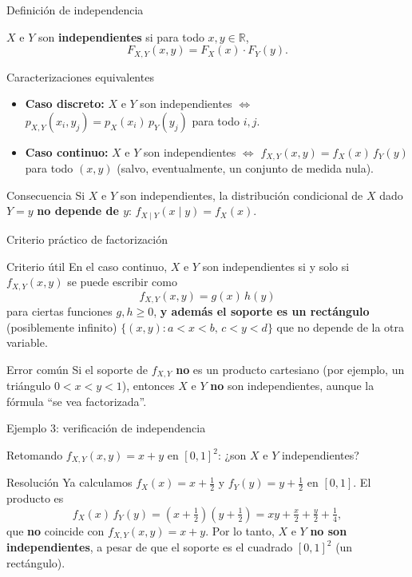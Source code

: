 \documentclass[aspectratio=169,11pt]{beamer}
\begin{document}
\begin{frame}{Definición de independencia}
\begin{definition}[Independencia]
$X$ e $Y$ son \textbf{independientes} si para todo $x,y \in \mathbb{R}$,
\[
F_{X,Y}(x,y) = F_X(x)\cdot F_Y(y).
\]
\end{definition}
\pause
\begin{block}{Caracterizaciones equivalentes}
\begin{itemize}
\item \textbf{Caso discreto:} $X$ e $Y$ son independientes $\iff$ $p_{X,Y}(x_i,y_j) = p_X(x_i)\, p_Y(y_j)$ para todo $i,j$.
\item \textbf{Caso continuo:} $X$ e $Y$ son independientes $\iff$ $f_{X,Y}(x,y) = f_X(x)\, f_Y(y)$ para todo $(x,y)$ (salvo, eventualmente, un conjunto de medida nula).
\end{itemize}
\end{block}
\begin{alertblock}{Consecuencia}
Si $X$ e $Y$ son independientes, la distribución condicional de $X$ dado $Y=y$ \textbf{no depende de $y$}: $f_{X\mid Y}(x\mid y) = f_X(x)$.
\end{alertblock}
\end{frame}

\begin{frame}{Criterio práctico de factorización}
\begin{block}{Criterio útil}
En el caso continuo, $X$ e $Y$ son independientes si y solo si $f_{X,Y}(x,y)$ se puede escribir como
\[
f_{X,Y}(x,y) = g(x)\, h(y)
\]
para ciertas funciones $g,h \ge 0$, \textbf{y además el soporte es un rectángulo} (posiblemente infinito) $\{(x,y): a<x<b, \, c<y<d\}$ que no depende de la otra variable.
\end{block}
\begin{alertblock}{Error común}
Si el soporte de $f_{X,Y}$ \textbf{no} es un producto cartesiano (por ejemplo, un triángulo $0<x<y<1$), entonces $X$ e $Y$ \textbf{no} son independientes, aunque la fórmula ``se vea factorizada''.
\end{alertblock}
\end{frame}

\begin{frame}{Ejemplo 3: verificación de independencia}
\begin{example}
Retomando $f_{X,Y}(x,y)=x+y$ en $[0,1]^2$: ¿son $X$ e $Y$ independientes?
\end{example}
\pause
\begin{block}{Resolución}
Ya calculamos $f_X(x) = x+\tfrac12$ y $f_Y(y)=y+\tfrac12$ en $[0,1]$. El producto es
\[
f_X(x)\, f_Y(y) = \left(x+\tfrac12\right)\left(y+\tfrac12\right) = xy + \tfrac{x}{2}+\tfrac{y}{2}+\tfrac14,
\]
que \textbf{no} coincide con $f_{X,Y}(x,y) = x+y$. Por lo tanto, $X$ e $Y$ \textbf{no son independientes}, a pesar de que el soporte es el cuadrado $[0,1]^2$ (un rectángulo).
\end{block}
\end{frame}
\end{document}
